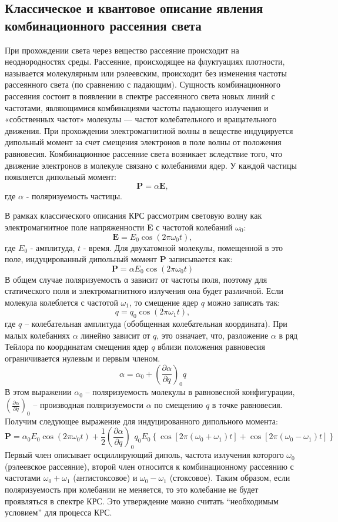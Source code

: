 \documentclass[a4paper,12pt]{article} %
\begin{document}
\subsection{Классическое и квантовое описание явления комбинационного
рассеяния света}
При прохождении света через вещество рассеяние происходит на
неоднородностях среды. Рассеяние,
происходящее на флуктуациях плотности, называется молекулярным или
рэлеевским, происходит без изменения частоты
рассеянного света (по сравнению с падающим). Сущность комбинационного
рассеяния состоит в появлении в спектре рассеянного света новых линий с
частотами, являющимися комбинациями частоты падающего излучения и
«собственных частот» молекулы — частот колебательного и вращательного
движения.
При прохождении электромагнитной волны в веществе индуцируется
дипольный момент за счет смещения электронов в поле волны от положения
равновесия. Комбинационное рассеяние света возникает вследствие того, что
движение электронов в молекуле связано с колебаниями ядер.
У каждой частицы
появляется дипольный момент: \[\textbf{P}=\alpha\textbf{E},\] где $\alpha$ - поляризуемость частицы.

В рамках классического описания КРС рассмотрим световую волну
как электромагнитное поле напряженности \textbf{E} с частотой колебаний $\omega_0$:
\[\textbf{E}=E_0\cos(2\pi\omega_0t),\]
где $E_0$ - амплитуда, $t$ - время. Для двухатомной молекулы, помещенной в это
поле, индуцированный дипольный момент \textbf{P} записывается как:
\[\textbf{P}=\alpha E_0\cos(2\pi\omega_0t)\]
В общем случае поляризуемость α зависит от частоты поля, поэтому для
статического поля и электромагнитного излучения она будет различной. Если молекула колеблется с частотой $\omega_1$, то смещение ядер $q$ можно записать
так: \[q=q_0\cos(2\pi\omega_1t),\]
где $q$ – колебательная амплитуда (обобщенная
колебательная координата). При малых колебаниях $\alpha$ линейно зависит от $q$,
это означает, что, разложение $\alpha$ в ряд Тейлора по координатам смещения ядер $q$
вблизи положения равновесия ограничивается нулевым и первым членом.
\[\alpha=\alpha_0 + \left(\frac{\partial\alpha}{\partial q}\right)_0q\]
В этом выражении $\alpha_0$ – поляризуемость молекулы в равновесной
конфигурации, $\left(\frac{\partial\alpha}{\partial q}\right)_0$ – производная поляризуемости $\alpha$ по смещению $q$ в
точке равновесия.
Получим следующее выражение для индуцированного дипольного момента:
\[\textbf{P}=\alpha_0 E_0\cos(2\pi\omega_0t) + \frac{1}{2}\left(\frac{\partial\alpha}{\partial q}\right)_0q_0E_0\left\{\cos\left[2\pi(\omega_0 + \omega_1)t\right] + \cos\left[2\pi(\omega_0 - \omega_1)t\right]\right\}\]
Первый член описывает осциллирующий диполь, частота излучения которого
$\omega_0$ (рэлеевское рассеяние), второй член относится к комбинационному
рассеянию с частотами $\omega_0 + \omega_1$ (антистоксовое) и $\omega_0 - \omega_1$ (стоксовое). Таким образом, если
поляризуемость при колебании не меняется, то это колебание не будет
проявляться в спектре КРС. Это утверждение можно считать “необходимым
условием” для процесса КРС.
\end{document}
